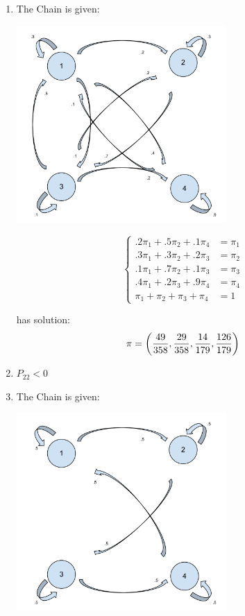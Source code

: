 \documentclass[12pt]{article}
\begin{document}
\begin{enumerate}
\begin{enumerate}
\item The Chain is given:\\

\begin{center}
\includegraphics[width=8cm]{Markov_Chains_Ex_2-e.pdf}
\end{center}
$$
\begin{cases}
.2\pi_1+.5\pi_2+.1\pi_4&=\pi_1\\
.3\pi_1+.3\pi_2+.2\pi_3&=\pi_2\\
.1\pi_1+.7\pi_2+.1\pi_3&=\pi_3\\
.4\pi_1+.2\pi_3+.9\pi_4&=\pi_4\\
\pi_1+\pi_2+\pi_3+\pi_4&=1
\end{cases}$$

has solution:
$$
\pi=\left({49\over 358},{29\over 358},{14\over 179},{126\over 179}\right)
$$


\item $P_{22}<0$
\item The Chain is given:\\


\begin{center}
\includegraphics[width=8cm]{Markov_Chains_Ex_2-g.pdf}
\end{center}


\end{enumerate}
\end{enumerate}
\end{document}
